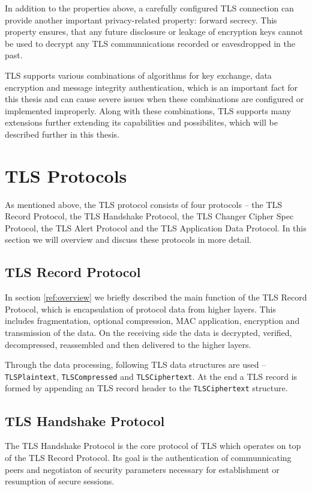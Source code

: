     In addition to the properties above, a carefully configured TLS connection
    can provide another important privacy-related property: forward secrecy.
    This property ensures, that any future disclosure or leakage of encryption
    keys cannot be used to decrypt any TLS communnications recorded or
    eavesdropped in the past.

    TLS supports various combinations of algorithms for key exchange, data
    encryption and message integrity authentication, which is an important fact
    for this thesis and can cause severe issues when these combinations
    are configured or implemented improperly. Along with these combinations,
    TLS supports many extensions further extending its capabilities and possibilites,
    which will be described further in this thesis.

\section{TLS Protocols}
    As mentioned above, the TLS protocol consists of four protocols --
    the TLS Record Protocol, the TLS Handshake Protocol, the TLS Changer Cipher
    Spec Protocol, the TLS Alert Protocol and the TLS Application Data Protocol.
    In this section we will overview and discuss these protocols in more detail.

\subsection{TLS Record Protocol}
    In section \ref{ref:overview} we briefly described the main function of the
    TLS Record Protocol, which is encapsulation of protocol data from higher
    layers. This includes fragmentation, optional compression, MAC application,
    encryption and transmission of the data. On the receiving side the data is
    decrypted, verified, decompressed, reassembled and then delivered to the
    higher layers.

    Through the data processing, following TLS data structures are used --
    \texttt{TLSPlaintext}, \texttt{TLSCompressed} and \texttt{TLSCiphertext}.
    At the end a TLS record is formed by appending an TLS record header to
    the \texttt{TLSCiphertext} structure.

\subsection{TLS Handshake Protocol} \label{ref:tls_handshake_protocol}
    The TLS Handshake Protocol is the core protocol of TLS which operates on
    top of the TLS Record Protocol. Its goal is the authentication of communnicating
    peers and negotiaton of security parameters necessary for establishment or
    resumption of secure sessions.

